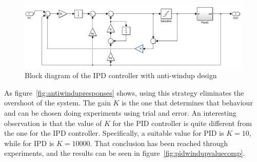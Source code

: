 \begin{figure}[!h]
	\centering
	\includegraphics[width=1\linewidth]{graphics/ipdwindupdesign}
	\caption{Block diagram of the IPD controller with anti-windup design}
	\label{fig:ipdantiwindupstrategy}
\end{figure}

As figure~\ref{fig:antiwindupresponses} shows, using this strategy eliminates the overshoot of the system. The gain $K$ is the one that determines that behaviour and can be chosen doing experiments using trial and error. An interesting observation is that the value of $K$ for the PID controller is quite different from the one for the IPD controller. Specifically, a suitable value for PID is $K=10$, while for IPD is $K=10000$. That conclusion has been reached through experiments, and the results can be seen in figure~\ref{fig:pidwindupvaluecomp}.

